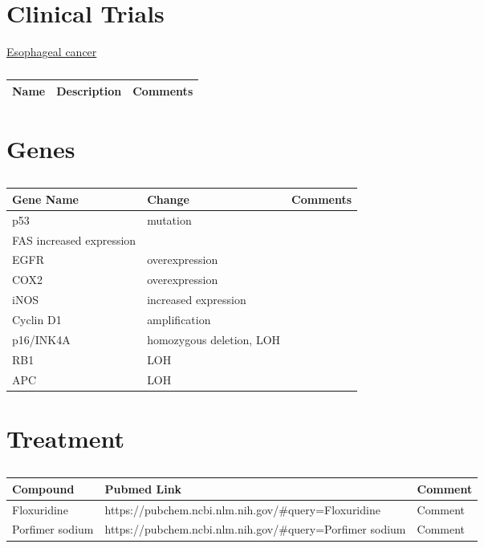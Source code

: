 \section{Clinical Trials}

\href{https://clinicaltrials.gov/ct2/results?cond=Esophageal+cancer&term=&cntry=&state=&city=&dist=}{Esophageal cancer}

\begin{table}[H]\centering
  \caption {\cite{key460}}
	\begin{tabular}{p{1cm}p{4cm}p{3cm}}
		Name & Description & Comments\\
		\hline
		\hline
	\end{tabular}
\end{table}

\section{Genes}

\begin{table}[H]\centering
  \caption {\cite{key400}}
	\begin{tabular}{p{1cm}p{4cm}p{3cm}}
		Gene Name & Change & Comments\\
		\hline
    p53  & mutation & \\
    FAS increased expression & \\
    EGFR & overexpression & \\
    COX2 & overexpression &  \\
    iNOS & increased expression & \\
    Cyclin D1 & amplification & \\
    p16/INK4A & homozygous deletion, LOH & \\
    RB1  & LOH & \\
    APC  & LOH & \\
		\hline
	\end{tabular}
\end{table}

\section{Treatment}

\begin{table}[H]\centering
 \caption {\cite{key470}\cite{key400}}
	\begin{tabular}{p{1cm}p{4cm}p{3cm}}
	Compound & Pubmed Link & Comment\\
		\hline
	Floxuridine & https://pubchem.ncbi.nlm.nih.gov/#query=Floxuridine & Comment\\
	Porfimer sodium & https://pubchem.ncbi.nlm.nih.gov/#query=Porfimer sodium & Comment\\
	\hline
	\end{tabular}
\end{table}



